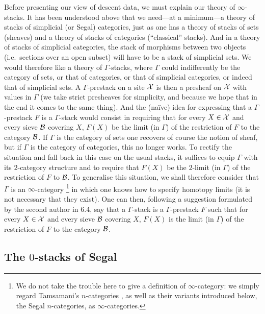 Before presenting our view of descent data, we must explain our theory of
$\infty$-stacks. It has been understood above that we need---at a
minimum---a theory of stacks of simplicial (or Segal) categories, just as one
has a theory of stacks of sets (sheaves) and a theory of stacks of categories
(``classical'' stacks). And in a theory of stacks of simplicial categories,
the stack of morphisms between two objects (i.e.\ sections over an open
subset) will have to be a stack of simplicial sets. We would therefore like a
theory of $\Gamma$-stacks, where $\Gamma$ could indifferently be the category
of sets, or that of categories, or that of simplicial categories, or indeed
that of simplicial sets. A $\Gamma$-prestack on a site ${\cal X}$ is then a
presheaf on ${\cal X}$ with values in $\Gamma$ (we take strict presheaves for
simplicity, and because we hope that in the end it comes to the same thing).
And the (naïve) idea for expressing that a $\Gamma$-prestack $F$ is a
$\Gamma$-stack would consist in requiring that for every $X \in {\cal X}$ and
every sieve ${\cal B}$ covering $X$, $F(X)$ be the limit (in $\Gamma$) of the
restriction of $F$ to the category ${\cal B}$. If $\Gamma$ is the category of
sets one recovers of course the notion of sheaf, but if $\Gamma$ is the
category of categories, this no longer works. To rectify the situation and
fall back in this case on the usual stacks, it suffices to equip $\Gamma$
with its $2$-category structure and to require that $F(X)$ be the $2$-limit
(in $\Gamma$) of the restriction of $F$ to ${\cal B}$. To generalise this
situation, we shall therefore consider that $\Gamma$ is an $\infty$-category
\footnote{We do not take the trouble here to give a definition of
$\infty$-category: we simply regard Tamsamani's $n$-categories
\cite{Tamsamani}, as well as their variants introduced below, the Segal
$n$-categories, as $\infty$-categories.} in which one knows how to specify
homotopy limits (it is not necessary that they exist). One can then,
following a suggestion formulated by the second author in \cite{limits} 6.4,
say that a $\Gamma$-stack is a $\Gamma$-prestack $F$ such that for every
$X \in {\cal X}$ and every sieve ${\cal B}$ covering $X$, $F(X)$ is the limit (in
$\Gamma$) of the restriction of $F$ to the category ${\cal B}$.

\subsection*{The \texorpdfstring{$0$}{0}-stacks of Segal}

